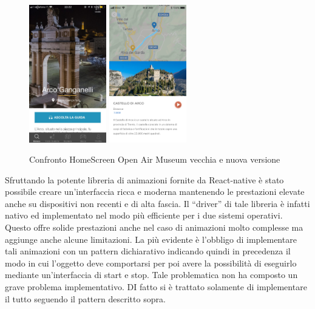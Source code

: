 \begin{figure}[h]
\centering
\includegraphics[width=0.3\textwidth]{images/screenSantarcangelo1.jpg}
\includegraphics[width=0.3\textwidth]{images/singolopunto.png}
\caption{Confronto HomeScreen Open Air Museum vecchia e nuova versione}
\end{figure}
\vspace{5mm}


Sfruttando la potente libreria di animazioni fornite da React-native è stato possibile creare un'interfaccia ricca e moderna mantenendo le prestazioni elevate anche su dispositivi non recenti e di alta fascia. Il “driver” di tale libreria è infatti nativo ed implementato nel modo più efficiente per i due sistemi operativi. Questo offre solide prestazioni anche nel caso di animazioni molto complesse ma aggiunge anche alcune limitazioni. La più evidente è l’obbligo di implementare tali animazioni con un pattern dichiarativo indicando quindi in precedenza il modo in cui l’oggetto deve comportarsi per poi avere la possibilità di eseguirlo mediante un'interfaccia di start e stop. Tale problematica non ha composto un grave problema implementativo. DI fatto si è trattato solamente di implementare il tutto seguendo il pattern descritto sopra.\vspace{5mm}

